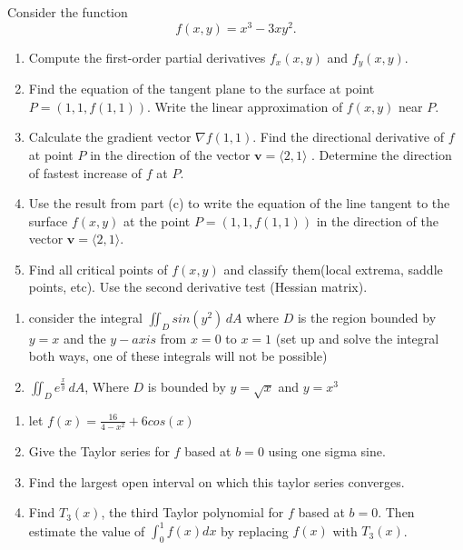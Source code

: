\documentclass[11pt]{article}
\newenvironment{exercise}{
    \begin{mdframed}[style=problemstyle]\textcolor{black}{}
}{
    \end{mdframed}
}
\begin{document}
\newpage
\begin{exercise}
Consider the function $$f(x, y) = x^3 - 3xy^2.$$

\begin{enumerate}[label={\alph*}]

\item  
Compute the first-order partial derivatives $f_x(x, y)$ and $f_y(x, y)$. 

\item Find the equation of the tangent plane to the surface at point $P = (1,1, f(1,1))$.  
    Write the linear approximation of $f(x,y)$ near $P$.  

\item 
Calculate the gradient vector $\nabla f(1,1)$.  
Find the directional derivative of $f$ at point $P$ in the direction of the vector $\mathbf{v} = \langle 2, 1 \rangle$ .  
Determine the direction of fastest increase of $f$ at $P$.

\item 
    Use the result from part (c) to write the equation of the line tangent to the surface 
    $f(x, y)$ at the point $P = (1,1, f(1,1))$ in the direction of the vector $\mathbf{v} = \langle 2, 1 \rangle$.  

\item  
    Find all critical points of $f(x,y)$ and classify them(local extrema, saddle points, etc). 
    Use the second derivative test (Hessian matrix).

\end{enumerate}
\end{exercise}

\begin{exercise}
\begin{enumerate}[label={\alph*}]
    \item 
        consider the integral $\iint_D sin(y^2)\, dA$ where $D$ is the region
        bounded by $y=x$ and the $y-axis$ from $x=0$ to $x=1$
        (set up and solve the integral both ways, one of these integrals will not be possible)
    \item $\iint_D e^{\frac{x}{y}}\, dA$, Where $D$ is bounded by $y=\sqrt{x}$ and $y=x^3$ 
\end{enumerate}
\end{exercise}

\begin{exercise}
    \begin{enumerate}[label={\alph*}]
        \item let $f(x) = \frac{16}{4-x^2} + 6cos(x)$
        \item Give the Taylor series for $f$ based at $b=0$ using one sigma
        sine.
        \item Find the largest open interval on which this taylor series converges.
        \item Find $T_3(x)$, the third Taylor polynomial for $f$ based at $b=0$. Then 
        estimate the value of $\int_0^1 f(x)dx$ by replacing $f(x)$ with $T_3(x)$.
    \end{enumerate}
\end{exercise}
\end{document}
